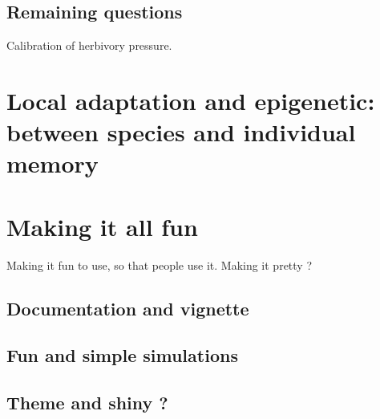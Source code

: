 \section{Remaining questions}

Calibration of herbivory pressure.


\chapter{Local adaptation and epigenetic: between species and individual memory}




\chapter{Making it all fun}
Making it fun to use, so that people use it.
Making it pretty ?

\section{Documentation and vignette}

\section{Fun and simple simulations}

\section{Theme and shiny ?}
